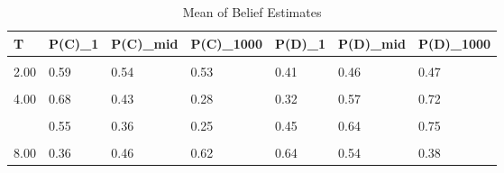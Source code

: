 \begin{table}[!h]
\centering
\caption{Mean of Belief Estimates}
\centering
\begin{tabular}[t]{lllllll}
\toprule
T & P(C)\_1 & P(C)\_mid & P(C)\_1000 & P(D)\_1 & P(D)\_mid & P(D)\_1000\\
\midrule
\cellcolor{gray!10}{1.00} & \cellcolor{gray!10}{0.69} & \cellcolor{gray!10}{0.37} & \cellcolor{gray!10}{0.36} & \cellcolor{gray!10}{0.31} & \cellcolor{gray!10}{0.63} & \cellcolor{gray!10}{0.64}\\
2.00 & 0.59 & 0.54 & 0.53 & 0.41 & 0.46 & 0.47\\
\cellcolor{gray!10}{3.00} & \cellcolor{gray!10}{0.55} & \cellcolor{gray!10}{0.29} & \cellcolor{gray!10}{0.27} & \cellcolor{gray!10}{0.45} & \cellcolor{gray!10}{0.71} & \cellcolor{gray!10}{0.73}\\
4.00 & 0.68 & 0.43 & 0.28 & 0.32 & 0.57 & 0.72\\
\cellcolor{gray!10}{5.00} & \cellcolor{gray!10}{0.60} & \cellcolor{gray!10}{0.37} & \cellcolor{gray!10}{0.18} & \cellcolor{gray!10}{0.40} & \cellcolor{gray!10}{0.63} & \cellcolor{gray!10}{0.82}\\
\addlinespace
6.00 & 0.55 & 0.36 & 0.25 & 0.45 & 0.64 & 0.75\\
\cellcolor{gray!10}{7.00} & \cellcolor{gray!10}{0.41} & \cellcolor{gray!10}{0.43} & \cellcolor{gray!10}{0.63} & \cellcolor{gray!10}{0.59} & \cellcolor{gray!10}{0.57} & \cellcolor{gray!10}{0.37}\\
8.00 & 0.36 & 0.46 & 0.62 & 0.64 & 0.54 & 0.38\\
\bottomrule
\end{tabular}
\end{table}